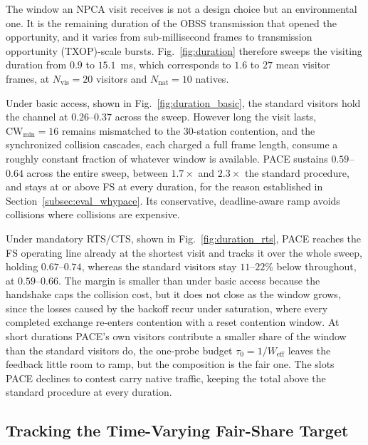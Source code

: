 \documentclass[conference]{IEEEtran}
\newcommand{\Nvis}{N_\mathrm{vis}}
\newcommand{\Nnat}{N_\mathrm{nat}}
\begin{document}
The window an NPCA visit receives is not a design choice but an
environmental one. It is the remaining duration of the OBSS transmission
that opened the opportunity, and it varies from sub-millisecond frames to
transmission opportunity (TXOP)-scale bursts. Fig.~\ref{fig:duration} therefore sweeps the visiting
duration from $0.9$ to $15.1$~ms, which corresponds to $1.6$ to $27$ mean
visitor frames, at
$\Nvis=20$ visitors and $\Nnat=10$ natives.

Under basic access, shown in Fig.~\ref{fig:duration_basic}, the standard
visitors hold the channel at $0.26$--$0.37$ across the sweep. However
long the visit lasts, $\mathrm{CW}_{\min}=16$ remains mismatched to the
$30$-station contention, and the synchronized collision cascades, each
charged a full frame length, consume a roughly constant fraction of
whatever window is available. PACE sustains $0.59$--$0.64$ across the
entire sweep, between $1.7\times$ and $2.3\times$ the standard
procedure, and stays at or above FS at every duration, for the reason
established in Section~\ref{subsec:eval_whypace}. Its conservative,
deadline-aware ramp avoids collisions where collisions are expensive.

Under mandatory RTS/CTS, shown in Fig.~\ref{fig:duration_rts}, PACE reaches the
FS operating line already at the shortest visit and tracks it over the
whole sweep, holding $0.67$--$0.74$, whereas the standard visitors stay
$11$--$22\%$ below throughout, at $0.59$--$0.66$. The margin is smaller
than under basic access because the handshake caps the collision cost,
but it does not close as the window grows, since the losses caused by the backoff
recur under saturation, where every completed exchange
re-enters contention with a reset contention window. At short durations
PACE's own visitors contribute a smaller share of the window than the
standard visitors do, the one-probe budget
$\tau_0=1/W_\mathrm{eff}$ leaves the feedback little room to ramp, but
the composition is the fair one. The slots PACE declines to contest
carry native traffic, keeping the total above the standard procedure
at every duration.

\subsection{Tracking the Time-Varying Fair-Share Target}
\label{subsec:eval_tracking}
\end{document}
